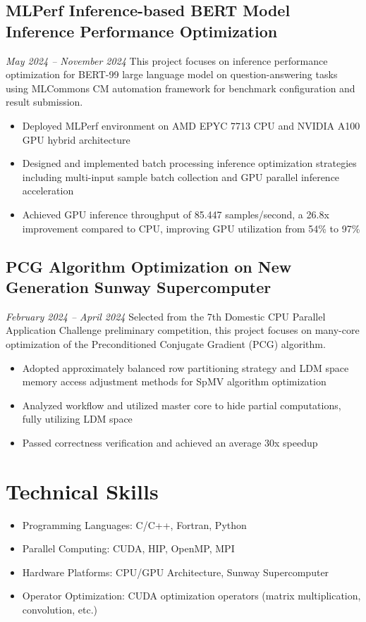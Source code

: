 \documentclass{resume}
\begin{document}
\subsection{\textbf{MLPerf Inference-based BERT Model Inference Performance Optimization}}
\textit{May 2024 -- November 2024}
This project focuses on inference performance optimization for BERT-99 large language model on question-answering tasks using MLCommons CM automation framework for benchmark configuration and result submission.
\begin{itemize}
  \item Deployed MLPerf environment on AMD EPYC 7713 CPU and NVIDIA A100 GPU hybrid architecture
  \item Designed and implemented batch processing inference optimization strategies including multi-input sample batch collection and GPU parallel inference acceleration
  \item Achieved GPU inference throughput of 85.447 samples/second, a 26.8x improvement compared to CPU, improving GPU utilization from 54\% to 97\%
\end{itemize}

\subsection{\textbf{PCG Algorithm Optimization on New Generation Sunway Supercomputer}}
\textit{February 2024 -- April 2024}
Selected from the 7th Domestic CPU Parallel Application Challenge preliminary competition, this project focuses on many-core optimization of the Preconditioned Conjugate Gradient (PCG) algorithm.
\begin{itemize}
  \item Adopted approximately balanced row partitioning strategy and LDM space memory access adjustment methods for SpMV algorithm optimization
  \item Analyzed workflow and utilized master core to hide partial computations, fully utilizing LDM space
  \item Passed correctness verification and achieved an average 30x speedup
\end{itemize}

\section{Technical Skills}
\begin{itemize}[parsep=0.5ex]
  \item Programming Languages: C/C++, Fortran, Python
  \item Parallel Computing: CUDA, HIP, OpenMP, MPI
  \item Hardware Platforms: CPU/GPU Architecture, Sunway Supercomputer
  \item Operator Optimization: CUDA optimization operators (matrix multiplication, convolution, etc.)
\end{itemize}
\end{document}
